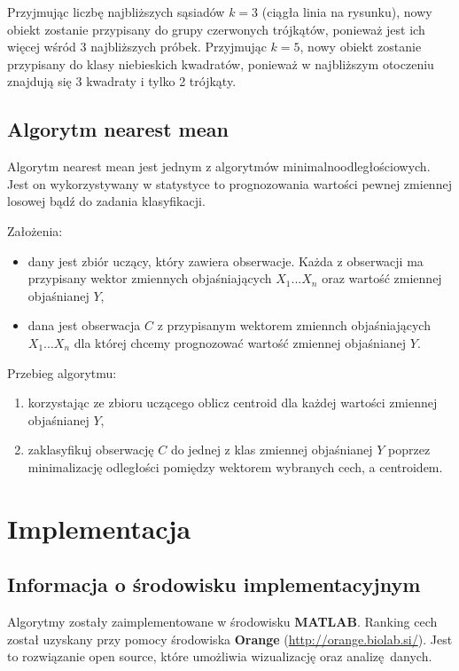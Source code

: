 \documentclass[11pt, a4paper, titlepage]{report}
\begin{document}
Przyjmując liczbę najbliższych sąsiadów $k = 3$ (ciągła linia na rysunku),  nowy obiekt zostanie przypisany do grupy czerwonych trójkątów, ponieważ jest ich więcej wśród 3 najbliższych próbek. Przyjmując $k = 5$, nowy obiekt zostanie przypisany do klasy niebieskich kwadratów, ponieważ w najbliższym otoczeniu znajdują się 3 kwadraty i tylko 2 trójkąty.

\section{Algorytm nearest mean}
\label{sec:Algorytm nearest mean}
Algorytm nearest mean jest jednym z algorytmów minimalnoodległościowych. Jest on wykorzystywany w statystyce to prognozowania wartości pewnej zmiennej losowej bądź do zadania klasyfikacji.

Założenia:
\begin{itemize}
  \item dany jest zbiór uczący, który zawiera obserwacje. Każda z obserwacji ma przypisany wektor zmiennych objaśniających $X_1...X_n$ oraz wartość zmiennej objaśnianej $Y$,
  \item dana jest obserwacja $C$ z przypisanym wektorem zmiennch objaśniających $X_1...X_n$ dla której chcemy prognozować wartość zmiennej objaśnianej $Y$.
\end{itemize}

Przebieg algorytmu:
\begin{enumerate}
  \item korzystając ze zbioru uczącego oblicz centroid dla każdej wartości zmiennej objaśnianej $Y$,
  \item zaklasyfikuj obserwację $C$ do jednej z klas zmiennej objaśnianej $Y$ poprzez minimalizację odległości pomiędzy wektorem wybranych cech, a centroidem.
\end{enumerate}

\chapter{Implementacja}
\label{chap:Implementacja}
\section{Informacja o środowisku implementacyjnym}
\label{sec:Informacja o środowisku implementacyjnym}
Algorytmy zostały zaimplementowane w środowisku \textbf{MATLAB}. Ranking cech został uzyskany przy pomocy środowiska \textbf{Orange} (\url{http://orange.biolab.si/}). Jest to rozwiązanie open source, które umożliwia wizualizację oraz analizę~danych.
\end{document}
